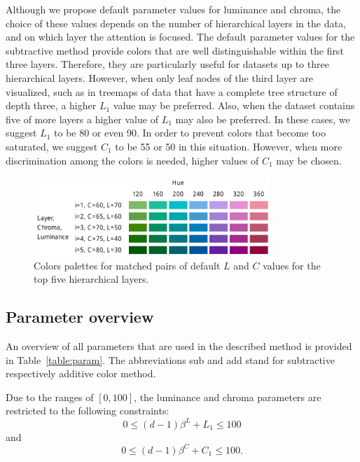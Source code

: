 \documentclass[review,journal]{vgtc}         %
\begin{document}
Although we propose default parameter values for luminance and chroma, the choice of these values depends on the number of hierarchical layers in the data, and on which layer the attention is focused. The default parameter values for the subtractive method provide colors that are well distinguishable within the first three layers. Therefore, they are particularly useful for datasets up to three hierarchical layers. However, when only leaf nodes of the third layer are visualized, such as in treemaps of data that have a complete tree structure of depth three, a higher $L_1$ value may be preferred. Also, when the dataset contains five of more layers a higher value of $L_1$ may also be preferred. In these cases, we suggest $L_1$ to be 80 or even 90. In order to prevent colors that become too saturated, we suggest $C_1$ to be 55 or 50 in this situation. However, when more discrimination among the colors is needed, higher values of $C_1$ may be chosen.

\begin{figure}[!t]
  \centering
  \includegraphics[width=3.5in]{LC3.pdf}
  \caption{Colors palettes for matched pairs of default $L$ and $C$ values for the top five hierarchical layers.}\label{fig:lc3}
\end{figure}



\subsection{Parameter overview}

An overview of all parameters that are used in the described method is provided in Table~\ref{table:param}. The abbreviations sub and add stand for subtractive respectively additive color method.

Due to the ranges of $[0, 100]$, the luminance and chroma parameters are restricted to the following constraints:
\begin{equation}
0 \leq (d-1)\beta^L + L_1 \leq 100
\end{equation}
and 
\begin{equation}
0 \leq (d-1)\beta^C + C_1 \leq 100.
\end{equation}
\end{document}
